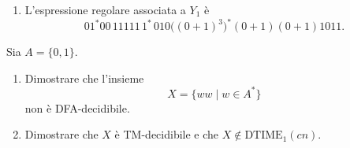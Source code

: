 \begin{sol}
\begin{enumerate}
\[\begin{tikzpicture}[
        >=stealth', shorten >=1pt, auto,
        every state/.style={circle, draw, fill=white, minimum size=0.8cm, inner sep=1pt}
    ]
    \draw[->] ([shift={(-0.7,0.7)}]n0.center) -- (n0);
    \draw[->] (n0) -- node {$\varepsilon$} (a0);
    \draw[->] (n0) -- node[swap] {$\varepsilon$} (b0);
    \end{tikzpicture}
    \]
    \item L'espressione regolare associata a $Y_1$ è
    \[
    01^*00\,11111\,1^*\,010\big((0+1)^3\big)^*(0+1)(0+1)1011.
    \]
\end{enumerate}
\end{sol}
\newpage

\begin{ex}
Sia $A=\{0,1\}$.
\ \begin{enumerate}
    \item Dimostrare che l'insieme
    \[
    X=\{ww\mid w\in A^*\}
    \]
    non è DFA-decidibile.
    \item Dimostrare che $X$ è TM-decidibile e che $X\notin \mathrm{DTIME}_1(cn)$.
\end{enumerate}
\end{ex}

